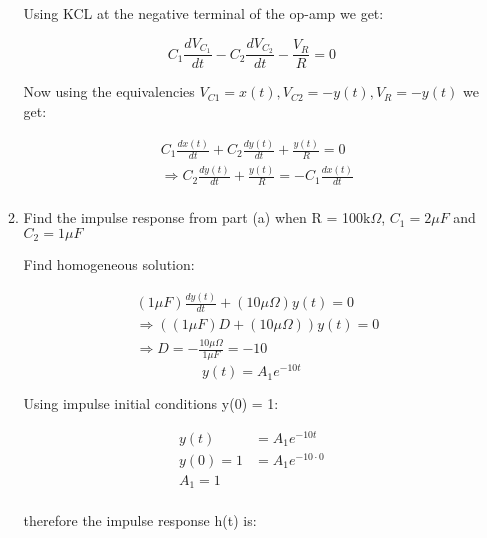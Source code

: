 \documentclass{article}
\begin{document}
\begin{enumerate}
\begin{multicols*}{2}
\begin{enumerate}
        \begin{center}
            Using KCL at the negative terminal of the op-amp we get:
        \end{center}
        \begin{equation}
            C_1 \frac{dV_{C_1}}{dt} - C_2 \frac{dV_{C_2}}{dt} - \frac{V_R}{R} = 0
        \end{equation}
        \begin{center}
            Now using the equivalencies $V_{C1} = x(t), V_{C2} = -y(t), V_{R} = -y(t)$ we get:
        \end{center}
        \begin{align}
            &C_1 \frac{dx(t)}{dt} + C_2 \frac{dy(t)}{dt} + \frac{y(t)}{R} = 0\\
            &\Rightarrow \boxed{C_2 \frac{dy(t)}{dt} + \frac{y(t)}{R} = -C_1 \frac{dx(t)}{dt}}\\
        \end{align}
        \item Find the impulse response from part (a) when R = 100k$\Omega$, $C_1 = 2\mu F$ and $C_2 = 1\mu F$
        \begin{center}
            Find homogeneous solution:
        \end{center}
        \begin{align}
            &(1\mu F )\frac{dy(t)}{dt} + (10\mu\Omega)y(t) = 0\\
            &\Rightarrow ((1\mu F )D + (10\mu\Omega))y(t) = 0\\
            &\Rightarrow D = -\frac{10\mu\Omega}{1\mu F} = -10
        \end{align}
        \begin{equation}
            y(t) = A_1e^{-10t} 
        \end{equation}
        \begin{center}
            Using impulse initial conditions y(0) = 1:
        \end{center}
        \begin{align}
            y(t) &= A_1e^{-10t}\\ 
            y(0) = 1 &= A_1e^{-10\cdot0}\\
            A_1 = 1\\
        \end{align}
        \begin{center}
            therefore the impulse response h(t) is:
        \end{center}
        \begin{equation}

\end{equation}
\end{enumerate}
\end{multicols*}
\end{enumerate}
\end{document}
